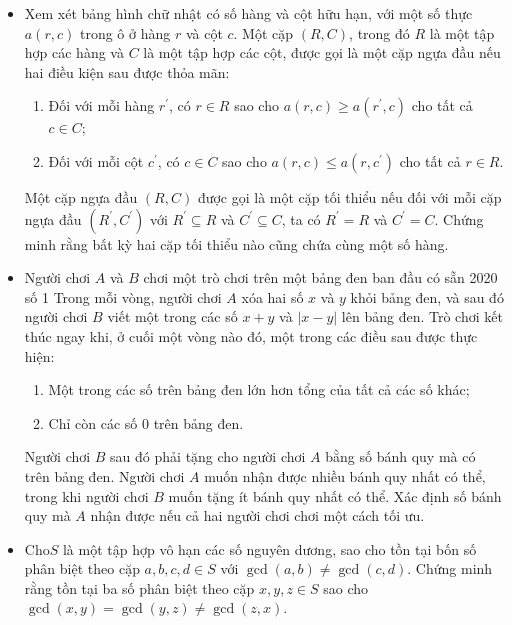 \documentclass[11pt]{scrartcl}
\begin{document}
\begin{itemize}[label=, leftmargin=0em, itemsep=-0em]
    \item \begin{btvn}
        Xem xét bảng hình chữ nhật có số hàng và cột hữu hạn, với một số thực $a(r, c)$ trong ô ở hàng $r$ và cột $c$. Một cặp $(R, C)$, trong đó $R$ là một tập hợp các hàng và $C$ là một tập hợp các cột, được gọi là một cặp ngựa đầu nếu hai điều kiện sau được thỏa mãn:
        \begin{enumerate}
            \item Đối với mỗi hàng $r^{\prime}$, có $r \in R$ sao cho $a(r, c) \geqslant a\left(r^{\prime}, c\right)$ cho tất cả $c \in C$;
            \item Đối với mỗi cột $c^{\prime}$, có $c \in C$ sao cho $a(r, c) \leqslant a\left(r, c^{\prime}\right)$ cho tất cả $r \in R$.
        \end{enumerate}
        Một cặp ngựa đầu $(R, C)$ được gọi là một cặp tối thiểu nếu đối với mỗi cặp ngựa đầu $\left(R^{\prime}, C^{\prime}\right)$ với $R^{\prime} \subseteq R$ và $C^{\prime} \subseteq C$, ta có $R^{\prime}=R$ và $C^{\prime}=C$. Chứng minh rằng bất kỳ hai cặp tối thiểu nào cũng chứa cùng một số hàng.
    \end{btvn}

    \item \begin{btvn}
        Người chơi $A$ và $B$ chơi một trò chơi trên một bảng đen ban đầu có sẵn 2020 số 1 Trong mỗi vòng, người chơi $A$ xóa hai số $x$ và $y$ khỏi bảng đen, và sau đó người chơi $B$ viết một trong các số $x+y$ và $|x-y|$ lên bảng đen. Trò chơi kết thúc ngay khi, ở cuối một vòng nào đó, một trong các điều sau được thực hiện:
        \begin{enumerate}
            \item Một trong các số trên bảng đen lớn hơn tổng của tất cả các số khác;
            \item Chỉ còn các số 0 trên bảng đen.
        \end{enumerate}
    Người chơi $B$ sau đó phải tặng cho người chơi $A$ bằng số bánh quy mà có trên bảng đen. Người chơi $A$ muốn nhận được nhiều bánh quy nhất có thể, trong khi người chơi $B$ muốn tặng ít bánh quy nhất có thể. Xác định số bánh quy mà $A$ nhận được nếu cả hai người chơi chơi một cách tối ưu.
    \end{btvn}

    \item \begin{btvn}
        Cho$S$ là một tập hợp vô hạn các số nguyên dương, sao cho tồn tại bốn số phân biệt theo cặp $a,b,c,d \in S$ với $\gcd(a,b) \neq \gcd(c,d)$. Chứng minh rằng tồn tại ba số phân biệt theo cặp $x,y,z \in S$ sao cho $\gcd(x,y)=\gcd(y,z) \neq \gcd(z,x)$.
    \end{btvn}


\end{itemize}
\end{document}
